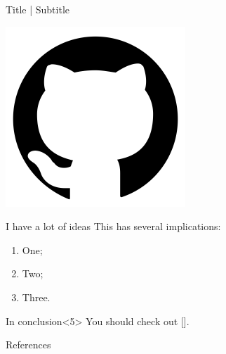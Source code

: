 \documentclass{beamer}
\begin{document}
\begin{frame}{Title | Subtitle}
\begin{center}
	\includegraphics[width=0.15\linewidth]{img/github}
\end{center}

\begin{block}{I have a lot of ideas}
	This has several implications:\pause
\begin{enumerate}[<+->]
    \item[\incarrow] One;
    \item[\incarrow] Two;
    \item[\incarrow] Three.
\end{enumerate}
\end{block}

\begin{exampleblock}{In conclusion}<5>
	You should check out [\cite{highway-env}].
\end{exampleblock}
\end{frame}

\begin{frame}{References}
\printbibliography
\end{frame}
\end{document}

